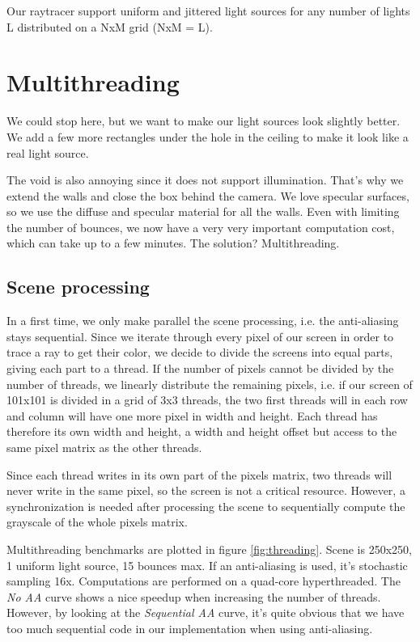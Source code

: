Our raytracer support uniform and jittered light sources for any number of lights L distributed on a NxM grid (NxM = L).
\pagebreak

\section{Multithreading}
We could stop here, but we want to make our light sources look slightly better. We add a few more rectangles under the hole in the ceiling to make it look like a real light source.

The void is also annoying since it does not support illumination. That's why we extend the walls and close the box behind the camera. We love specular surfaces, so we use the diffuse and specular material for all the walls. Even with limiting the number of bounces, we now have a very very important computation cost, which can take up to a few minutes. The solution? Multithreading.

\subsection{Scene processing}
In a first time, we only make parallel the scene processing, i.e. the anti-aliasing stays sequential. Since we iterate through every pixel of our screen in order to trace a ray to get their color, we decide to divide the screens into equal parts, giving each part to a thread. If the number of pixels cannot be divided by the number of threads, we linearly distribute the remaining pixels, i.e. if our screen of 101x101 is divided in a grid of 3x3 threads, the two first threads will in each row and column will have one more pixel in width and height. Each thread has therefore its own width and height, a width and height offset but access to the same pixel matrix as the other threads.

Since each thread writes in its own part of the pixels matrix, two threads will never write in the same pixel, so the screen is not a critical resource. However, a synchronization is needed after processing the scene to sequentially compute the grayscale of the whole pixels matrix.

Multithreading benchmarks are plotted in figure \ref{fig:threading}. Scene is 250x250, 1 uniform light source, 15 bounces max. If an anti-aliasing is used, it's stochastic sampling 16x. Computations are performed on a quad-core hyperthreaded. The \textit{No AA} curve shows a nice speedup when increasing the number of threads. However, by looking at the \textit{Sequential AA} curve, it's quite obvious that we have too much sequential code in our implementation when using anti-aliasing.


